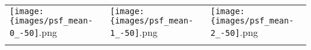  \begin{tabular}{lll}
\texttt{[image: \{images/psf\_mean-0\_-50]}.png} &\texttt{[image: \{images/psf\_mean-1\_-50]}.png} &\texttt{[image: \{images/psf\_mean-2\_-50]}.png} 
 \\ \hfill\end{tabular}